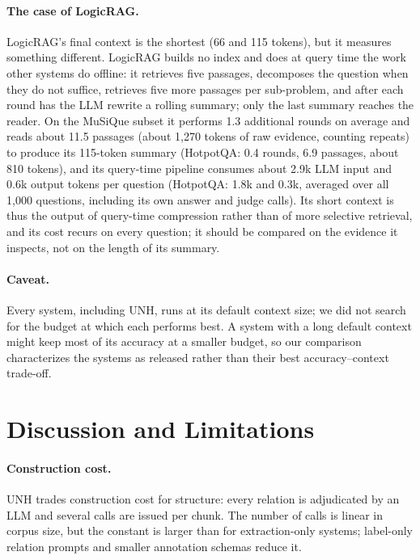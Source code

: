 \documentclass[runningheads]{llncs}
\newcommand{\sys}{UNH}
\begin{document}
\paragraph{The case of LogicRAG.}
LogicRAG's final context is the shortest (66 and 115 tokens), but it measures something different. LogicRAG builds no index and does at query time the work other systems do offline: it retrieves five passages, decomposes the question when they do not suffice, retrieves five more passages per sub-problem, and after each round has the LLM rewrite a rolling summary; only the last summary reaches the reader. On the MuSiQue subset it performs 1.3 additional rounds on average and reads about 11.5 passages (about 1{,}270 tokens of raw evidence, counting repeats) to produce its 115-token summary (HotpotQA: 0.4 rounds, 6.9 passages, about 810 tokens), and its query-time pipeline consumes about 2.9k LLM input and 0.6k output tokens per question (HotpotQA: 1.8k and 0.3k, averaged over all 1{,}000 questions, including its own answer and judge calls). Its short context is thus the output of query-time compression rather than of more selective retrieval, and its cost recurs on every question; it should be compared on the evidence it inspects, not on the length of its summary.

\paragraph{Caveat.}
Every system, including \sys{}, runs at its default context size; we did not search for the budget at which each performs best. A system with a long default context might keep most of its accuracy at a smaller budget, so our comparison characterizes the systems as released rather than their best accuracy--context trade-off.

\section{Discussion and Limitations}
\label{sec:limitations}

\paragraph{Construction cost.}
\sys{} trades construction cost for structure: every relation is adjudicated by an LLM and several calls are issued per chunk. The number of calls is linear in corpus size, but the constant is larger than for extraction-only systems; label-only relation prompts and smaller annotation schemas reduce it.
\end{document}
